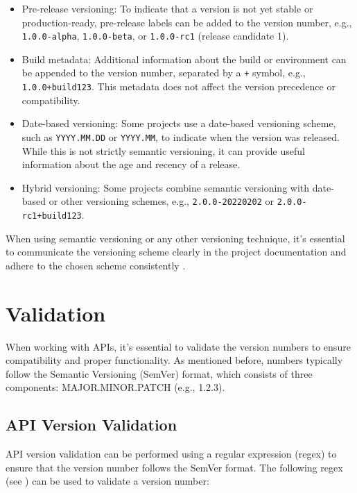 \documentclass{article}
\begin{document}
\begin{itemize}
    \item Pre-release versioning: To indicate that a version is not yet stable or production-ready, pre-release labels can be added to the version number, e.g., \texttt{1.0.0-alpha}, \texttt{1.0.0-beta}, or \texttt{1.0.0-rc1} (release candidate 1).
    \item Build metadata: Additional information about the build or environment can be appended to the version number, separated by a \texttt{+} symbol, e.g., \texttt{1.0.0+build123}. This metadata does not affect the version precedence or compatibility.
    \item Date-based versioning: Some projects use a date-based versioning scheme, such as \texttt{YYYY.MM.DD} or \texttt{YYYY.MM}, to indicate when the version was released. While this is not strictly semantic versioning, it can provide useful information about the age and recency of a release.
    \item Hybrid versioning: Some projects combine semantic versioning with date-based or other versioning schemes, e.g., \texttt{2.0.0-20220202} or \texttt{2.0.0-rc1+build123}.
\end{itemize}

When using semantic versioning or any other versioning technique, it's essential to communicate the versioning scheme clearly in the project documentation and adhere to the chosen scheme consistently \cite{DesigningWebAPIs}.

\section{Validation}

When working with APIs, it's essential to validate the version numbers to ensure compatibility and proper functionality. As mentioned before, numbers typically follow the Semantic Versioning (SemVer) format, which consists of three components: MAJOR.MINOR.PATCH (e.g., 1.2.3).

\subsection{API Version Validation}

API version validation can be performed using a regular expression (regex) to ensure that the version number follows the SemVer format. The following regex (see \cite{dibRegex101BuildTest}) can be used to validate a version number:
\end{document}
